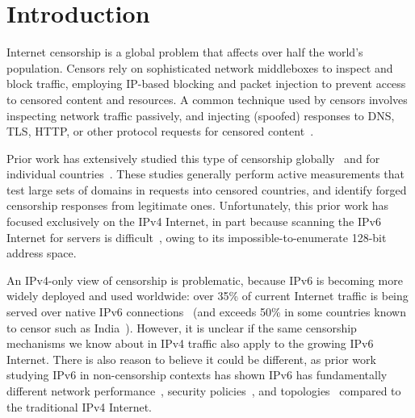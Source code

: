 \section{Introduction}\label{sec:intro}


Internet censorship is a global problem that affects over half the world's
population. Censors rely on sophisticated network middleboxes to inspect and
block traffic, employing IP-based blocking and packet injection to prevent
access to censored content and resources. A common technique used by censors involves
inspecting network traffic
passively, and injecting (spoofed) responses to DNS, TLS, HTTP, or other protocol
requests for censored
content~\cite{lowe2007great,vandersloot2018quack,xu2011internet,aryan2013internet,chai2019importance,elmenhorst2021web}.


Prior work has extensively studied this type of censorship
globally~\cite{niaki2020iclab,sundara2020censored,filasto2012ooni,razaghpanah2016exploring,kuhrer2015going,dagon2008corrupted,pearce2017global,scott2016satellite}
%
and for individual
countries~\cite{Anonymous2020:TripletCensors,USESEC21:GFWatch,aryan2013internet,ramesh2020decentralized,yadav2018light,gebhart2017internet,nabi2013anatomy}.
%
These studies generally perform active measurements that test large
sets of domains in requests into censored countries, and identify forged
censorship responses from legitimate ones.
%
Unfortunately, this prior work has focused exclusively on the IPv4 Internet, in
part because scanning the IPv6 Internet for servers is
difficult~\cite{murdock2017target}, owing to its impossible-to-enumerate 128-bit
address space.
%

An IPv4-only view of censorship is problematic, because
IPv6 is becoming more widely deployed and used worldwide: over 35\% of current Internet
traffic is being served over native IPv6 connections~\cite{Google-IPv6} (and exceeds
50\% in some countries known to censor such as India~\cite{akamai-ipv6}).
However, it
is unclear if the same censorship mechanisms we know about in IPv4 traffic
also apply to the growing IPv6 Internet.
There is also reason to believe it could be
different, as prior work studying IPv6 in non-censorship contexts has shown IPv6 has
fundamentally different network performance~\cite{Dhamdhere-IMC2012}, security
policies~\cite{Czyz-NDSS2016}, and topologies~\cite{Czyz-SIGCOMM2014}
compared to the traditional IPv4 Internet.
%

